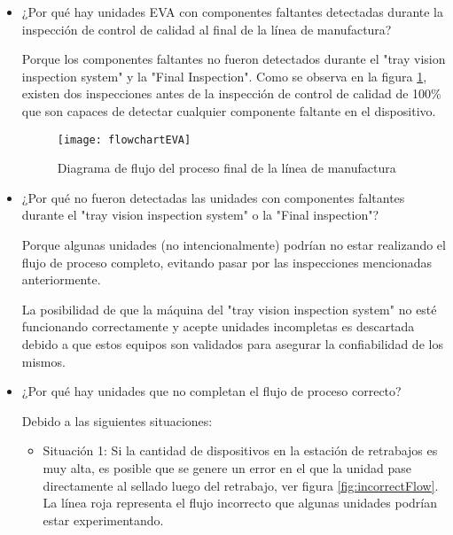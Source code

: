 \begin{itemize}

    \item ¿Por qu\'e hay unidades EVA con componentes faltantes detectadas durante la inspecci\'on de control de calidad al final de la l\'inea de manufactura?
    
    Porque los componentes faltantes no fueron detectados durante el "tray vision inspection system" y la "Final Inspection". Como se observa en la figura \ref{fig:flowchart}, existen dos inspecciones antes de la inspecci\'on
    de control de calidad de 100\% que son capaces de detectar cualquier componente
    faltante en el dispositivo.
    
    \begin{figure}[H]
    \centering
    \texttt{[image: flowchartEVA]}
    \caption{Diagrama de flujo del proceso final de la l\'inea de manufactura}
    \label{fig:flowchart}
    \end{figure}
    
    \item ¿Por qu\'e no fueron detectadas las unidades con componentes faltantes durante el "tray vision inspection system" o la "Final inspection"?
    
    Porque algunas unidades (no intencionalmente) podr\'ian no estar realizando el flujo de proceso completo, evitando pasar por las inspecciones mencionadas anteriormente.
    
    La posibilidad de que la m\'aquina del "tray vision inspection system" no est\'e funcionando correctamente y acepte unidades incompletas es descartada debido a que
    estos equipos son validados para asegurar la confiabilidad de los mismos.
    
    \item ¿Por qu\'e hay unidades que no completan el flujo de proceso correcto? \par
    Debido a las siguientes situaciones:
    
        \begin{itemize}
        
            \item Situaci\'on 1: Si la cantidad de dispositivos en la estaci\'on de retrabajos es muy
            alta, es posible que se genere un error en el que la unidad pase directamente
            al sellado luego del retrabajo, ver figura \ref{fig:incorrectFlow}. La l\'inea roja representa el flujo
            incorrecto que algunas unidades podr\'ian estar experimentando.
            

\end{itemize}
\end{itemize}
